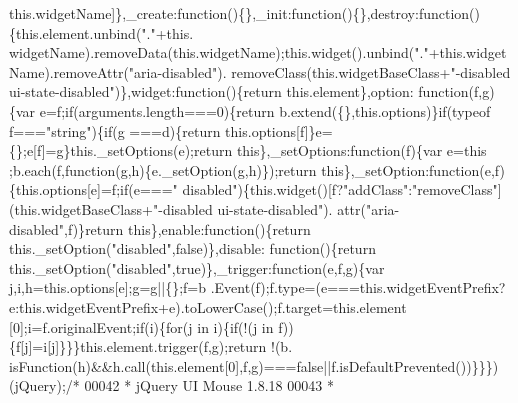 \begin{DoxyCode}
      this.widgetName]\},\_create:\textcolor{keyword}{function}()\{\},\_init:\textcolor{keyword}{function}()\{\},destroy:\textcolor{keyword}{function}()\{this.element.unbind(\textcolor{stringliteral}{"."}+this.
      widgetName).removeData(this.widgetName);this.widget().unbind(\textcolor{stringliteral}{"."}+this.widgetName).removeAttr(\textcolor{stringliteral}{"aria-disabled"}).
      removeClass(this.widgetBaseClass+\textcolor{stringliteral}{"-disabled ui-state-disabled"})\},widget:\textcolor{keyword}{function}()\{\textcolor{keywordflow}{return} this.element\},option:\textcolor{keyword}{
      function}(f,g)\{var e=f;\textcolor{keywordflow}{if}(arguments.length===0)\{\textcolor{keywordflow}{return} b.extend(\{\},this.options)\}\textcolor{keywordflow}{if}(typeof f===\textcolor{stringliteral}{"string"})\{\textcolor{keywordflow}{if}(g
      ===d)\{\textcolor{keywordflow}{return} this.options[f]\}e=\{\};e[f]=g\}this.\_setOptions(e);\textcolor{keywordflow}{return} \textcolor{keyword}{this}\},\_setOptions:\textcolor{keyword}{function}(f)\{var e=\textcolor{keyword}{this}
      ;b.each(f,\textcolor{keyword}{function}(g,h)\{e.\_setOption(g,h)\});\textcolor{keywordflow}{return} \textcolor{keyword}{this}\},\_setOption:\textcolor{keyword}{function}(e,f)\{this.options[e]=f;\textcolor{keywordflow}{if}(e===\textcolor{stringliteral}{"
      disabled"})\{this.widget()[f?\textcolor{stringliteral}{"addClass"}:\textcolor{stringliteral}{"removeClass"}](this.widgetBaseClass+\textcolor{stringliteral}{"-disabled ui-state-disabled"}).
      attr(\textcolor{stringliteral}{"aria-disabled"},f)\}\textcolor{keywordflow}{return} \textcolor{keyword}{this}\},enable:\textcolor{keyword}{function}()\{\textcolor{keywordflow}{return} this.\_setOption(\textcolor{stringliteral}{"disabled"},\textcolor{keyword}{false})\},disable:\textcolor{keyword}{
      function}()\{\textcolor{keywordflow}{return} this.\_setOption(\textcolor{stringliteral}{"disabled"},\textcolor{keyword}{true})\},\_trigger:\textcolor{keyword}{function}(e,f,g)\{var j,i,h=this.options[e];g=g||\{\};f=b
      .Event(f);f.type=(e===this.widgetEventPrefix?e:this.widgetEventPrefix+e).toLowerCase();f.target=this.element
      [0];i=f.originalEvent;\textcolor{keywordflow}{if}(i)\{\textcolor{keywordflow}{for}(j in i)\{\textcolor{keywordflow}{if}(!(j in f))\{f[j]=i[j]\}\}\}this.element.trigger(f,g);\textcolor{keywordflow}{return} !(b.
      isFunction(h)&&h.call(this.element[0],f,g)===\textcolor{keyword}{false}||f.isDefaultPrevented())\}\}\})(jQuery);\textcolor{comment}{/*}
00042 \textcolor{comment}{ * jQuery UI Mouse 1.8.18}
00043 \textcolor{comment}{ *}

\end{DoxyCode}
